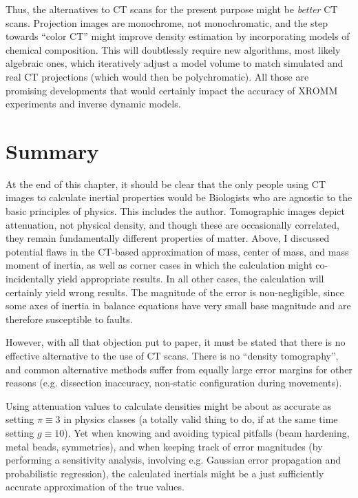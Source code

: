 Thus, the alternatives to CT scans for the present purpose might be \emph{better} CT scans.
Projection images are monochrome, not monochromatic, and the step towards ``color CT'' might improve density estimation by incorporating models of chemical composition.
This will doubtlessly require new algorithms, most likely algebraic ones, which iteratively adjust a model volume to match simulated and real CT projections (which would then be polychromatic).
All those are promising developments that would certainly impact the accuracy of XROMM experiments and inverse dynamic models.


\clearpage
\section{Summary}
\label{sec:orge48f62d}
At the end of this chapter, it should be clear that the only people using CT images to calculate inertial properties would be Biologists who are agnostic to the basic principles of physics.
This includes the author.
Tomographic images depict attenuation, not physical density, and though these are occasionally correlated, they remain fundamentally different properties of matter.
Above, I discussed potential flaws in the CT-based approximation of mass, center of mass, and mass moment of inertia, as well as corner cases in which the calculation might co-incidentally yield appropriate results.
In all other cases, the calculation will certainly yield wrong results.
The magnitude of the error is non-negligible, since some axes of inertia in balance equations have very small base magnitude and are therefore susceptible to faults.


However, with all that objection put to paper, it must be stated that there is no effective alternative to the use of CT scans.
There is no ``density tomography'', and common alternative methods suffer from equally large error margins for other reasons (e.g. dissection inaccuracy, non-static configuration during movements).

Using attenuation values to calculate densities might be about as accurate as setting \(\pi \equiv 3\) in physics classes (a totally valid thing to do, if at the same time setting \(g \equiv 10\)).
Yet when knowing and avoiding typical pitfalls (beam hardening, metal beads, symmetries), and when keeping track of error magnitudes (by performing a sensitivity analysis, involving e.g. Gaussian error propagation and probabilistic regression), the calculated inertials might be a just sufficiently accurate approximation of the true values.
